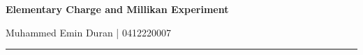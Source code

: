 \documentclass[a4paper,10pt]{report}
\begin{document}
\raggedbottom
{}

\pagestyle{fancy}
\fancyhf{}
\fancyfoot[C]{\thepage}
\setlength{\headheight}{14pt}

\begin{center}
{\Large \bfseries Elementary Charge and Millikan Experiment\par}
\vspace{3pt}
{\normalsize Muhammed Emin Duran | 0412220007\par}
\vspace{4pt}
\rule{\textwidth}{1pt}
\end{center}

\vspace{2pt}

\setlength{\columnsep}{20pt}
\setlength{\columnseprule}{0.5pt}
\end{document}

